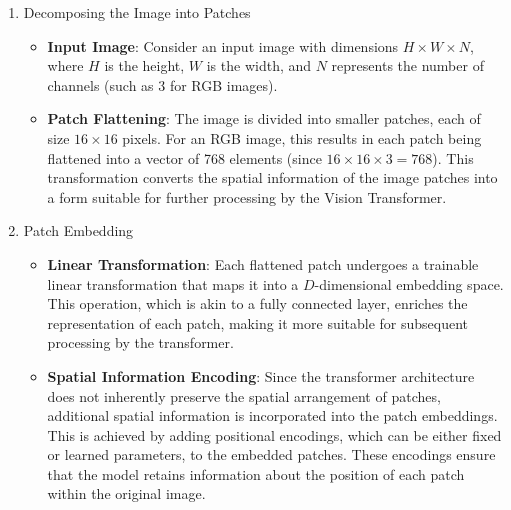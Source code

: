 \documentclass[12pt,a4paper]{report}
\begin{document}
\begin{enumerate}
  \item Decomposing the Image into Patches
        \begin{itemize}
          \item \textbf{Input Image}: Consider an input image with dimensions \( H \times W \times N \), where \( H \) is the height, \( W \) is the width, and \( N \) represents the number of channels (such as 3 for RGB images).
          \item \textbf{Patch Flattening}: The image is divided into smaller patches, each of size \( 16 \times 16 \) pixels. For an RGB image, this results in each patch being flattened into a vector of 768 elements (since \( 16 \times 16 \times 3 = 768 \)). This transformation converts the spatial information of the image patches into a form suitable for further processing by the Vision Transformer.
        \end{itemize}

  \item Patch Embedding
        \begin{itemize}
          \item \textbf{Linear Transformation}: Each flattened patch undergoes a trainable linear transformation that maps it into a \( D \)-dimensional embedding space. This operation, which is akin to a fully connected layer, enriches the representation of each patch, making it more suitable for subsequent processing by the transformer.
          \item \textbf{Spatial Information Encoding}: Since the transformer architecture does not inherently preserve the spatial arrangement of patches, additional spatial information is incorporated into the patch embeddings. This is achieved by adding positional encodings, which can be either fixed or learned parameters, to the embedded patches. These encodings ensure that the model retains information about the position of each patch within the original image.
        \end{itemize}


\end{enumerate}
\end{document}
